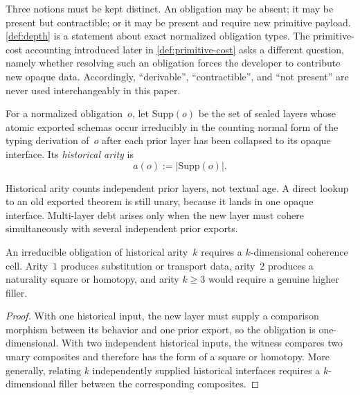 \documentclass{lmcs}
\newcommand{\Supp}{\mathrm{Supp}}
\begin{document}
\begin{rem}
\label{rem:present-vs-cost}
Three notions must be kept distinct. An obligation may be absent; it may be present but contractible; or it may be present and require new primitive payload. \autoref{def:depth} is a statement about exact normalized obligation types. The primitive-cost accounting introduced later in \autoref{def:primitive-cost} asks a different question, namely whether resolving such an obligation forces the developer to contribute new opaque data. Accordingly, ``derivable'', ``contractible'', and ``not present'' are never used interchangeably in this paper.
\end{rem}

\begin{defi}
\label{def:arity}
For a normalized obligation~$o$, let $\Supp(o)$ be the set of sealed layers whose atomic exported schemas occur irreducibly in the counting normal form of the typing derivation of~$o$ after each prior layer has been collapsed to its opaque interface. Its \emph{historical arity} is
\[
  a(o) := |\Supp(o)|.
\]
\end{defi}

\begin{rem}
\label{rem:deep-lookups}
Historical arity counts independent prior layers, not textual age. A direct lookup to an old exported theorem is still unary, because it lands in one opaque interface. Multi-layer debt arises only when the new layer must cohere simultaneously with several independent prior exports.
\end{rem}

\begin{lem}
\label{lem:arity-dimension}
An irreducible obligation of historical arity~$k$ requires a $k$-dimensional coherence cell. Arity~$1$ produces substitution or transport data, arity~$2$ produces a naturality square or homotopy, and arity $k \geq 3$ would require a genuine higher filler.
\end{lem}

\begin{proof}
With one historical input, the new layer must supply a comparison morphism between its behavior and one prior export, so the obligation is one-dimensional. With two independent historical inputs, the witness compares two unary composites and therefore has the form of a square or homotopy. More generally, relating $k$ independently supplied historical interfaces requires a $k$-dimensional filler between the corresponding composites.
\end{proof}
\end{document}

